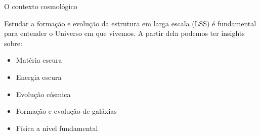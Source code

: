 

\begin{frame}[c]{O contexto cosmológico}
    \begin{splusbox}{}
        Estudar a formação e evolução da estrutura em larga escala (LSS) é fundamental para entender o Universo em que vivemos. A partir dela podemos ter insights sobre:
        \begin{itemize}
            \item Matéria escura
            \item Energia escura
            \item Evolução cósmica
            \item Formação e evolução de galáxias
            \item Física a nível fundamental
        \end{itemize}
    \end{splusbox}
\end{frame}

